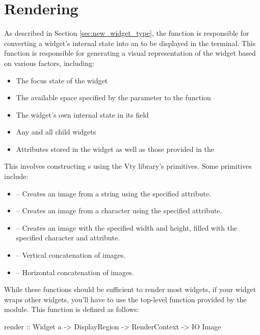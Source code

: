 \section{Rendering}

As described in Section \ref{sec:new_widget_type}, the 
function is responsible for converting a widget's internal state into
an  to be displayed in the terminal.  This function is
responsible for generating a visual representation of the widget based
on various factors, including:

\begin{itemize}
\item The focus state of the widget
\item The available space specified by the  parameter to the
   function
\item The widget's own internal state in its  field
\item Any and all child widgets
\item Attributes stored in the widget as well as those provided in the
\end{itemize}

This involves constructing s using the Vty library's
primitives.  Some primitives include:

\begin{itemize}
\item {} -- Creates an image from a string using the
  specified attribute.
\item {} -- Creates an image from a character using the
  specified attribute.
\item {} -- Creates an image with the specified width and
  height, filled with the specified character and attribute.
\item \fw{<->} -- Vertical concatenation of images.
\item \fw{<|>} -- Horizontal concatenation of images.
\end{itemize}

While these functions should be sufficient to render most widgets, if
your widget wraps other widgets, you'll have to use the top-level
 function provided by the  module.  This function
is defined as follows:

\begin{haskellcode}
 render :: Widget a -> DisplayRegion -> RenderContext -> IO Image
\end{haskellcode}

